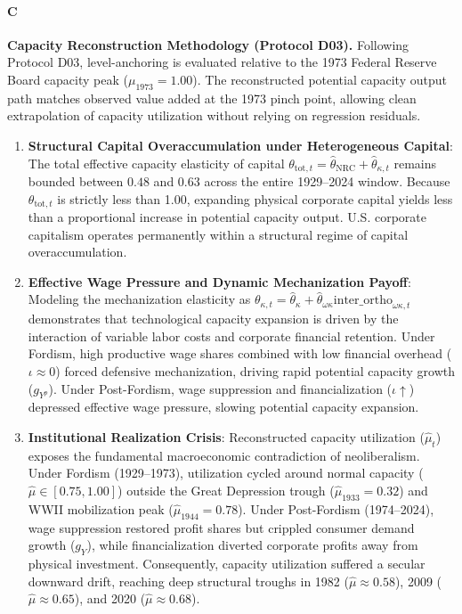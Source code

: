 \paragraph{C}
\textbf{Capacity Reconstruction Methodology (Protocol D03).} Following Protocol D03, level-anchoring is evaluated relative to the 1973 Federal Reserve Board capacity peak ($\mu_{1973} = 1.00$). The reconstructed potential capacity output path matches observed value added at the 1973 pinch point, allowing clean extrapolation of capacity utilization without relying on regression residuals.

\begin{enumerate}
	\item \textbf{Structural Capital Overaccumulation under Heterogeneous Capital}: The total effective capacity elasticity of capital $\theta_{\text{tot},t} = \hat{\theta}_{\text{NRC}} + \hat{\theta}_{\kappa,t}$ remains bounded between $0.48$ and $0.63$ across the entire 1929–2024 window. Because $\theta_{\text{tot},t}$ is strictly less than 1.00, expanding physical corporate capital yields less than a proportional increase in potential capacity output. U.S. corporate capitalism operates permanently within a structural regime of capital overaccumulation.
	\item \textbf{Effective Wage Pressure and Dynamic Mechanization Payoff}: Modeling the mechanization elasticity as $\theta_{\kappa,t} = \hat{\theta}_{\kappa} + \hat{\theta}_{\omega\kappa} \text{inter\_ortho}_{\omega\kappa, t}$ demonstrates that technological capacity expansion is driven by the interaction of variable labor costs and corporate financial retention. Under Fordism, high productive wage shares combined with low financial overhead ($\iota \approx 0$) forced defensive mechanization, driving rapid potential capacity growth ($g_{Y^p}$). Under Post-Fordism, wage suppression and financialization ($\iota \uparrow$) depressed effective wage pressure, slowing potential capacity expansion.
	\item \textbf{Institutional Realization Crisis}: Reconstructed capacity utilization ($\hat{\mu}_t$) exposes the fundamental macroeconomic contradiction of neoliberalism. Under Fordism (1929–1973), utilization cycled around normal capacity ($\hat{\mu} \in [0.75, 1.00]$) outside the Great Depression trough ($\hat{\mu}_{1933} = 0.32$) and WWII mobilization peak ($\hat{\mu}_{1944} = 0.78$). Under Post-Fordism (1974–2024), wage suppression restored profit shares but crippled consumer demand growth ($g_Y$), while financialization diverted corporate profits away from physical investment. Consequently, capacity utilization suffered a secular downward drift, reaching deep structural troughs in 1982 ($\hat{\mu} \approx 0.58$), 2009 ($\hat{\mu} \approx 0.65$), and 2020 ($\hat{\mu} \approx 0.68$).
\end{enumerate}

